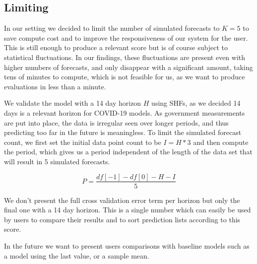 \subsection{Limiting}
In our setting we decided to limit the number of simulated forecasts to \(K=5\) to save compute cost and to improve the responsiveness of our system for the user. This is still enough to produce a relevant score but is of course subject to statistical fluctuations. In our findings, these fluctuations are present even with higher numbers of forecasts, and only disappear with a significant amount, taking tens of minutes to compute, which is not feasible for us, as we want to produce evaluations in less than a minute.

We validate the model with a 14 day horizon \(H\) using SHFs, as we decided 14 days is a relevant horizon for COVID-19 models. As government measurements are put into place, the data is irregular seen over longer periods, and thus predicting too far in the future is meaningless. To limit the simulated forecast count, we first set the initial data point count to be \(I = H  * 3\) and then compute the period, which gives us a period independent of the length of the data set that will result in 5 simulated forecasts.

\begin{equation}
    P=\dfrac{df[-1]-df[0]-H-I}{5}
    \label{eq:shfPeriods}
\end{equation}

We don't present the full cross validation error term per horizon but only the final one with a 14 day horizon. This is a single number which can easily be used by users to compare their results and to sort prediction lists according to this score.

In the future we want to present users comparisons with baseline models such as a model using the last value, or a sample mean.
